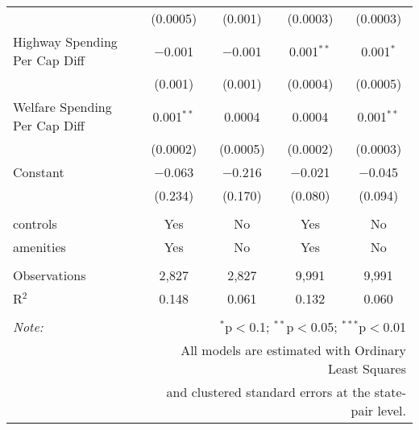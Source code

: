 \begin{table}[!htbp]
\begin{tabular}{@{\extracolsep{5pt}}lcccc}
  & (0.0005) & (0.001) & (0.0003) & (0.0003) \\ 
  Highway Spending Per Cap Diff & $-$0.001 & $-$0.001 & 0.001$^{**}$ & 0.001$^{*}$ \\ 
  & (0.001) & (0.001) & (0.0004) & (0.0005) \\ 
  Welfare Spending Per Cap Diff & 0.001$^{**}$ & 0.0004 & 0.0004 & 0.001$^{**}$ \\ 
  & (0.0002) & (0.0005) & (0.0002) & (0.0003) \\ 
  Constant & $-$0.063 & $-$0.216 & $-$0.021 & $-$0.045 \\ 
  & (0.234) & (0.170) & (0.080) & (0.094) \\ 
 \hline \\[-1.8ex] 
controls & Yes & No & Yes & No \\ 
amenities & Yes & No & Yes & No \\ 
\hline \\[-1.8ex] 
Observations & 2,827 & 2,827 & 9,991 & 9,991 \\ 
R$^{2}$ & 0.148 & 0.061 & 0.132 & 0.060 \\ 
\hline 
\hline \\[-1.8ex] 
\textit{Note:}  & \multicolumn{4}{r}{$^{*}$p$<$0.1; $^{**}$p$<$0.05; $^{***}$p$<$0.01} \\ 
 & \multicolumn{4}{r}{All models are estimated with Ordinary Least Squares} \\ 
 & \multicolumn{4}{r}{and clustered standard errors at the state-pair level.} \\ 
\end{tabular} 
\end{table} 
